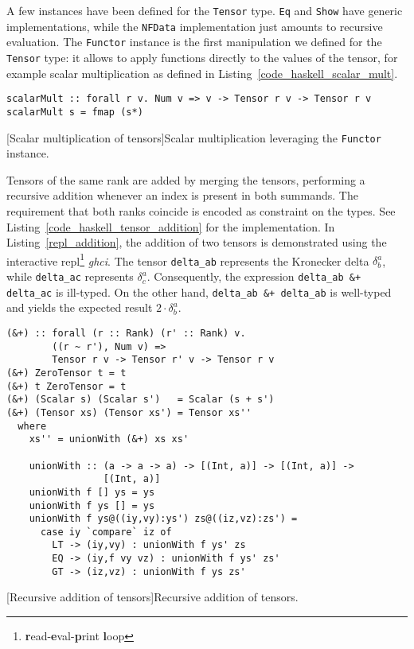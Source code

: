 A few instances have been defined for the \texttt{Tensor} type. \texttt{Eq} and \texttt{Show} have generic implementations, while the \texttt{NFData} implementation just amounts to recursive evaluation. The \texttt{Functor} instance is the first manipulation we defined for the \texttt{Tensor} type: it allows to apply functions directly to the values of the tensor, for example scalar multiplication as defined in Listing~\ref{code_haskell_scalar_mult}.
\begin{code}
  \begin{verbatim}
scalarMult :: forall r v. Num v => v -> Tensor r v -> Tensor r v
scalarMult s = fmap (s*)
  \end{verbatim}
  [Scalar multiplication of tensors]{Scalar multiplication leveraging the \texttt{Functor} instance.}
  \label{code_haskell_scalar_mult}
\end{code}
Tensors of the same rank are added by merging the tensors, performing a recursive addition whenever an index is present in both summands. The requirement that both ranks coincide is encoded as constraint on the types. See Listing~\ref{code_haskell_tensor_addition} for the implementation. In Listing~\ref{repl_addition}, the addition of two tensors is demonstrated using the interactive repl\footnote{\textbf{r}ead-\textbf{e}val-\textbf{p}rint \textbf{l}oop} \emph{ghci}. The tensor \texttt{delta_ab} represents the Kronecker delta $\delta^a_b$, while \texttt{delta_ac} represents $\delta^a_c$. Consequently, the expression \texttt{delta_ab &+ delta_ac} is ill-typed. On the other hand, \texttt{delta_ab &+ delta_ab} is well-typed and yields the expected result $2\cdot\delta^a_b$.
\begin{code}
  \begin{verbatim}
(&+) :: forall (r :: Rank) (r' :: Rank) v.
        ((r ~ r'), Num v) =>
        Tensor r v -> Tensor r' v -> Tensor r v
(&+) ZeroTensor t = t
(&+) t ZeroTensor = t
(&+) (Scalar s) (Scalar s')   = Scalar (s + s')
(&+) (Tensor xs) (Tensor xs') = Tensor xs''
  where
    xs'' = unionWith (&+) xs xs'

    unionWith :: (a -> a -> a) -> [(Int, a)] -> [(Int, a)] ->
                 [(Int, a)]
    unionWith f [] ys = ys
    unionWith f ys [] = ys
    unionWith f ys@((iy,vy):ys') zs@((iz,vz):zs') =
      case iy `compare` iz of
        LT -> (iy,vy) : unionWith f ys' zs
        EQ -> (iy,f vy vz) : unionWith f ys' zs'
        GT -> (iz,vz) : unionWith f ys zs'
  \end{verbatim}
  [Recursive addition of tensors]{Recursive addition of tensors.}
  \label{code_haskell_tensor_addition}
\end{code}

